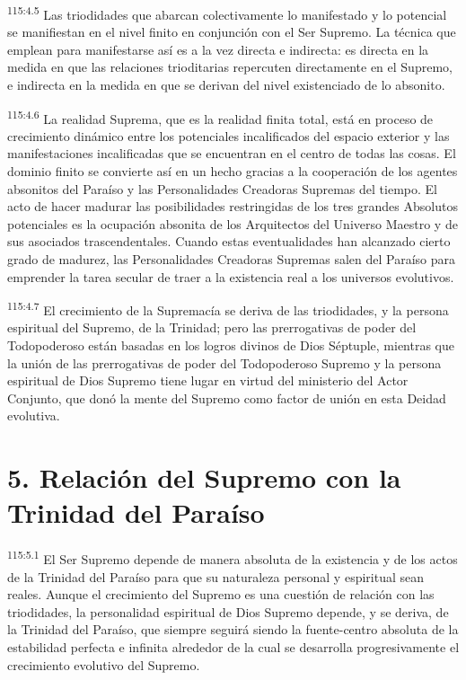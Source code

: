\documentclass[twoside, 11pt]{book}
\begin{document}
\par
\textsuperscript{115:4.5} Las triodidades que abarcan colectivamente lo manifestado y lo potencial se manifiestan en el nivel finito en conjunción con el Ser Supremo. La técnica que emplean para manifestarse así es a la vez directa e indirecta: es directa en la medida en que las relaciones trioditarias repercuten directamente en el Supremo, e indirecta en la medida en que se derivan del nivel existenciado de lo absonito.

\par
\textsuperscript{115:4.6} La realidad Suprema, que es la realidad finita total, está en proceso de crecimiento dinámico entre los potenciales incalificados del espacio exterior y las manifestaciones incalificadas que se encuentran en el centro de todas las cosas. El dominio finito se convierte así en un hecho gracias a la cooperación de los agentes absonitos del Paraíso y las Personalidades Creadoras Supremas del tiempo. El acto de hacer madurar las posibilidades restringidas de los tres grandes Absolutos potenciales es la ocupación absonita de los Arquitectos del Universo Maestro y de sus asociados trascendentales. Cuando estas eventualidades han alcanzado cierto grado de madurez, las Personalidades Creadoras Supremas salen del Paraíso para emprender la tarea secular de traer a la existencia real a los universos evolutivos.

\par
\textsuperscript{115:4.7} El crecimiento de la Supremacía se deriva de las triodidades, y la persona espiritual del Supremo, de la Trinidad; pero las prerrogativas de poder del Todopoderoso están basadas en los logros divinos de Dios Séptuple, mientras que la unión de las prerrogativas de poder del Todopoderoso Supremo y la persona espiritual de Dios Supremo tiene lugar en virtud del ministerio del Actor Conjunto, que donó la mente del Supremo como factor de unión en esta Deidad evolutiva.

\section*{5. Relación del Supremo con la Trinidad del Paraíso}
\par
\textsuperscript{115:5.1} El Ser Supremo depende de manera absoluta de la existencia y de los actos de la Trinidad del Paraíso para que su naturaleza personal y espiritual sean reales. Aunque el crecimiento del Supremo es una cuestión de relación con las triodidades, la personalidad espiritual de Dios Supremo depende, y se deriva, de la Trinidad del Paraíso, que siempre seguirá siendo la fuente-centro absoluta de la estabilidad perfecta e infinita alrededor de la cual se desarrolla progresivamente el crecimiento evolutivo del Supremo.
\end{document}

